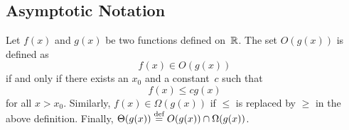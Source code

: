 \begin{subappendices}
  \section{Asymptotic Notation}
  \label{app:asymptotic}

  \begin{definition}
    \label{def:bigo}
    Let $f(x)$ and $g(x)$ be two functions defined on~$\mathbb{R}$. The set $O(g(x))$ is
    defined as
    \begin{equation*}
      f(x) \in O(g(x))
    \end{equation*}
    if and only if there exists an $x_0$ and a constant~$c$ such that
    \begin{equation*}
      f(x) \le c g(x)
    \end{equation*}
    for all $x > x_0$. 
    Similarly, $f(x) \in \Omega(g(x))$ if $\le$ is replaced by $\ge$ in
    the above definition. Finally, $\Theta(g(x)) \stackrel{\text{def}}{=} O(g(x)) \cap
    \Omega(g(x))$.
  \end{definition}

\end{subappendices}
